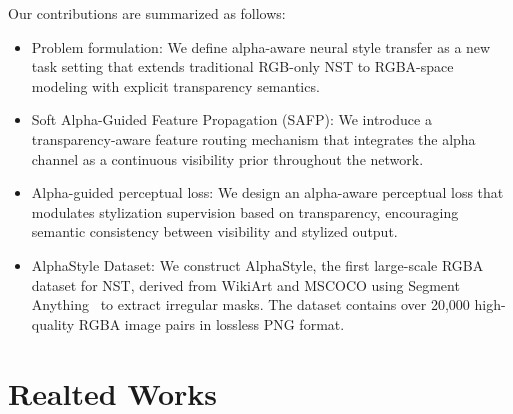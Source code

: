 \documentclass[letterpaper]{article} %
\begin{document}
Our contributions are summarized as follows:
\begin{itemize}
    \item {Problem formulation}: We define alpha-aware neural style transfer as a new task setting that extends traditional RGB-only NST to RGBA-space modeling with explicit transparency semantics.
    \item {Soft Alpha-Guided Feature Propagation (SAFP)}: We introduce a transparency-aware feature routing mechanism that integrates the alpha channel as a continuous visibility prior throughout the network. 
    \item {Alpha-guided perceptual loss}: We design an alpha-aware perceptual loss that modulates stylization supervision based on transparency, encouraging semantic consistency between visibility and stylized output.
    \item {AlphaStyle Dataset}: We construct AlphaStyle, the first large-scale RGBA dataset for NST, derived from WikiArt and MSCOCO using Segment Anything~\cite{kirillov2023segment} to extract irregular masks. The dataset contains over 20,000 high-quality RGBA image pairs in lossless PNG format.
\end{itemize}

\section{Realted Works}





\end{document}
